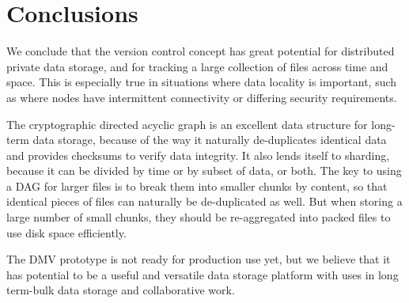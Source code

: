 \section{Conclusions}

We conclude that the version control concept has great potential for distributed private data storage, and
for tracking a large collection of files across time and space. This is
especially true in situations where data locality is important, such as where
nodes have intermittent connectivity or differing security requirements.

The cryptographic directed acyclic graph is an excellent data structure for long-term data
storage, because of the way it naturally de-duplicates identical data and
provides checksums to verify data integrity. It also lends itself to sharding,
because it can be divided by time or by subset of data, or both. The key to
using a \gls{DAG} for larger files is to break them into smaller chunks by
content, so that identical pieces of files can naturally be de-duplicated as
well. But when storing a large number of small chunks, they should be
re-aggregated into packed files to use disk space efficiently.

The \gls{DMV} prototype is not ready for production use yet, but we believe that
it has potential to be a useful and versatile data storage platform with uses in
long term-bulk data storage and collaborative work.
